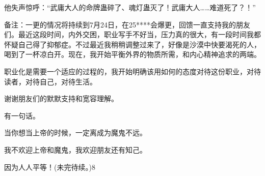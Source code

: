 \begin{this_body}
他失声惊呼：“武庸大人的命牌蛊碎了、魂灯蛊灭了！武庸大人……难道死了？！”

备注：一更的情况将持续到7月24日，在25****会爆更，回馈一直支持我的朋友们。最近这段时间，内外交困，职业写手不好当，压力真的很大，有一段时间我都怀疑自己得了抑郁症。不过最近我稍稍调整过来了，好像是沙漠中快要渴死的人，喝到了一杯凉白开。现在，我开始平衡外界的物质所需，和内心精神追求的两端。

职业化是需要一个适应的过程的，我开始明确该用如何的态度对待这份职业，对待读者，对待自己，对待生活。

谢谢朋友们的默默支持和宽容理解。

有一句话。

当你想当上帝的时候，一定离成为魔鬼不远。

我不欢迎上帝和魔鬼，我欢迎朋友还有知己。

因为人人平等！(未完待续。)8

\end{this_body}

